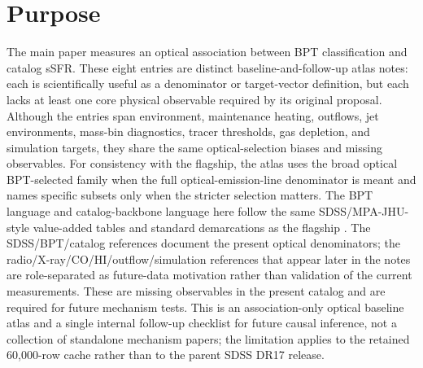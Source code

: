\documentclass[twocolumn]{aastex631}
\begin{document}
\section{Purpose}
The main paper measures an optical association between BPT classification and catalog sSFR. These eight entries are distinct baseline-and-follow-up atlas notes: each is scientifically useful as a denominator or target-vector definition, but each lacks at least one core physical observable required by its original proposal. Although the entries span environment, maintenance heating, outflows, jet environments, mass-bin diagnostics, tracer thresholds, gas depletion, and simulation targets, they share the same optical-selection biases and missing observables. For consistency with the flagship, the atlas uses the broad optical BPT-selected family when the full optical-emission-line denominator is meant and names specific subsets only when the stricter selection matters. The BPT language and catalog-backbone language here follow the same SDSS/MPA-JHU-style value-added tables and standard demarcations as the flagship \citep{sdssdr17,brinchmann2004,york2000,baldwin1981,kewley2001,kauffmann2003bpt,kewley2006,stasinska2008,stasinska2015}. The SDSS/BPT/catalog references document the present optical denominators; the radio/X-ray/CO/HI/outflow/simulation references that appear later in the notes are role-separated as future-data motivation rather than validation of the current measurements. These are missing observables in the present catalog and are required for future mechanism tests. This is an association-only optical baseline atlas and a single internal follow-up checklist for future causal inference, not a collection of standalone mechanism papers; the limitation applies to the retained 60,000-row cache rather than to the parent SDSS DR17 release.
\end{document}
